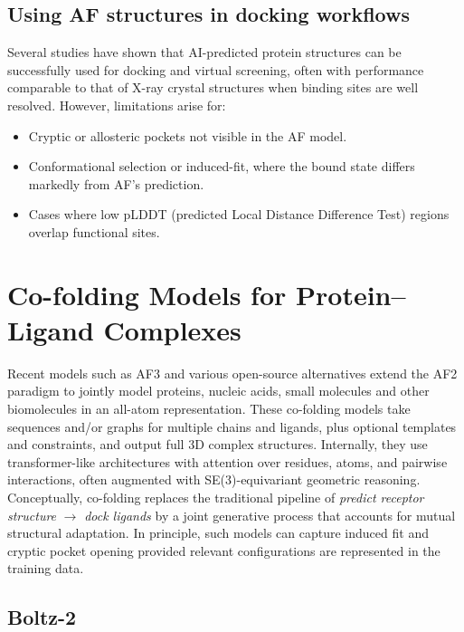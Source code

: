 \documentclass[12pt]{article}
\begin{document}
\subsection{Using AF structures in docking workflows}

Several studies have shown that AI-predicted protein structures can be successfully used for docking and virtual screening, often with performance comparable to that of X-ray crystal structures when binding sites are well resolved\cite{CH13_humanproteome2021,CH13_alphafoldimpact2022}. However, limitations arise for:
\begin{itemize}
  \item Cryptic or allosteric pockets not visible in the AF model.
  \item Conformational selection or induced-fit, where the bound state differs markedly from AF’s prediction.
  \item Cases where low pLDDT (predicted Local Distance Difference Test) regions overlap functional sites.
\end{itemize}

\section{Co-folding Models for Protein–Ligand Complexes}

Recent models such as AF3 and various open-source alternatives extend the AF2 paradigm to jointly model proteins, nucleic acids, small molecules and other biomolecules in an all-atom representation\cite{CH13_abramson2024accurate,CH13_proteinpredictionuntilcasp15,CH13_alphafoldbeyond2025}. These co-folding models take sequences and/or graphs for multiple chains and ligands, plus optional templates and constraints, and output full 3D complex structures. Internally, they use transformer-like architectures with attention over residues, atoms, and pairwise interactions, often augmented with SE(3)-equivariant geometric reasoning. Conceptually, co-folding replaces the traditional pipeline of \emph{predict receptor structure} $\to$ \emph{dock ligands} by a joint generative process that accounts for mutual structural adaptation. In principle, such models can capture induced fit and cryptic pocket opening provided relevant configurations are represented in the training data.

\subsection{Boltz-2}
\end{document}
